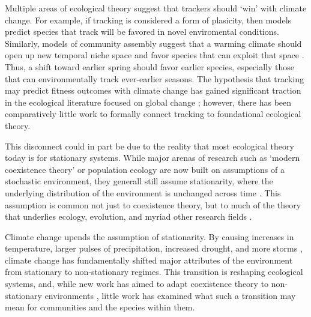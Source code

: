 \documentclass[11pt,letterpaper]{article}
\begin{document}
Multiple areas of ecological theory suggest that trackers should `win' with climate change. For example, if tracking is considered a form of plasicity, then models predict species that track will be favored in novel enviromental conditions. Similarly, models of community assembly suggest that a warming climate should open up new temporal niche space and favor species that can exploit that space \citep{gotelli1996,wolkovich:2010fee,Zettlemoyer2019}. Thus, a shift toward earlier spring should favor earlier species, especially those that can environmentally track ever-earlier seasons. The hypothesis that tracking may predict fitness outcomes with climate change has gained significant traction in the ecological literature focused on global change \citep[e.g.,][]{Cleland:2012}; however, there has been comparatively little work to formally connect tracking to foundational ecological theory.

This disconnect could in part be due to the reality that most ecological theory today is for stationary systems. While major arenas of research such as `modern coexistence theory' or population ecology are now built on assumptions of a stochastic environment, they generall still assume stationarity, where the underlying distribution of the environment is unchanged across time \citep[i.e., constant mean and variance,][]{barabas2018}. This assumption is common not just to coexistence theory, but to much of the theory that underlies ecology, evolution, and myriad other research fields \citep[e.g.,][]{Milly:2008yu,nosenko2013}. 

Climate change upends the assumption of stationarity. By causing increases in temperature, larger pulses of precipitation, increased drought, and more storms \citep{ipcc2013}, climate change has fundamentally shifted major attributes of the environment from stationary to non-stationary regimes. This transition is reshaping ecological systems, and, while new work has aimed to adapt coexistence theory to non-stationary environments \citep{chessonnonstat}, little work has examined what such a transition may mean for communities and the species within them.  %
\end{document}
